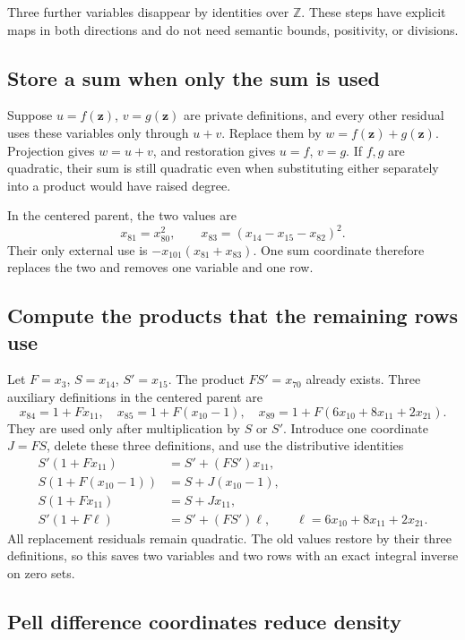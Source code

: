 \documentclass[11pt,letterpaper]{article}
\theoremstyle{definition}\newtheorem{definition}[theorem]{Definition}
\theoremstyle{remark}\newtheorem{remark}[theorem]{Remark}
\newcommand{\Z}{\mathbb Z}\newcommand{\N}{\mathbb N}
\begin{document}
Three further variables disappear by identities over \(\Z\). These
steps have explicit maps in both directions and do not need semantic
bounds, positivity, or divisions.

\subsection{Store a sum when only the sum is used}

Suppose \(u=f(\mathbf z)\), \(v=g(\mathbf z)\) are private definitions,
and every other residual uses these variables only through \(u+v\).
Replace them by \(w=f(\mathbf z)+g(\mathbf z)\). Projection gives
\(w=u+v\), and restoration gives \(u=f\), \(v=g\). If \(f,g\)
are quadratic, their sum is still quadratic even when substituting either
separately into a product would have raised degree.

In the centered parent, the two values are
\[
x_{81}=x_{80}^2,\qquad
x_{83}=(x_{14}-x_{15}-x_{82})^2.
\]
Their only external use is
\(-x_{101}(x_{81}+x_{83})\). One sum coordinate therefore replaces
the two and removes one variable and one row.

\subsection{Compute the products that the remaining rows use}

Let \(F=x_3\), \(S=x_{14}\), \(S'=x_{15}\). The product
\(FS'=x_{70}\) already exists. Three auxiliary definitions in the
centered parent are
\[
x_{84}=1+Fx_{11},\quad x_{85}=1+F(x_{10}-1),\quad
x_{89}=1+F(6x_{10}+8x_{11}+2x_{21}).
\]
They are used only after multiplication by \(S\) or \(S'\).
Introduce one coordinate \(J=FS\), delete these three definitions,
and use the distributive identities
\begin{align*}
S'(1+Fx_{11})&=S'+(FS')x_{11},\\
S(1+F(x_{10}-1))&=S+J(x_{10}-1),\\
S(1+Fx_{11})&=S+Jx_{11},\\
S'(1+F\ell)&=S'+(FS')\ell,
\qquad\ell=6x_{10}+8x_{11}+2x_{21}.
\end{align*}
All replacement residuals remain quadratic. The old values restore by
their three definitions, so this saves two variables and two rows with
an exact integral inverse on zero sets.

\subsection{Pell difference coordinates reduce density}
\end{document}
